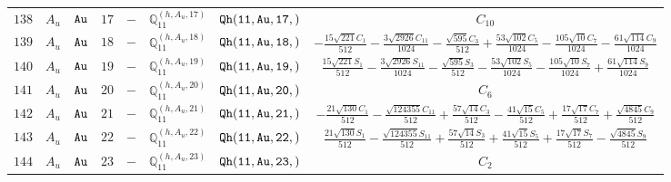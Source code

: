 \documentclass[fleqn,8pt]{jsarticle}
\begin{document}
\begin{table}[ht!]
\begin{center}
\begin{tabular}{cccccccc}
$ 138 $ & $ A_{u} $ & $ {\tt Au} $ & $ 17 $ & $ - $ & $ \mathbb{Q}_{11}^{(h,A_{u},17)} $ & $ {\tt Qh(11,Au,17,)} $ & $ C_{10} $ \\
$ 139 $ & $ A_{u} $ & $ {\tt Au} $ & $ 18 $ & $ - $ & $ \mathbb{Q}_{11}^{(h,A_{u},18)} $ & $ {\tt Qh(11,Au,18,)} $ & $ - \frac{15 \sqrt{221} C_{1}}{512} - \frac{3 \sqrt{2926} C_{11}}{1024} - \frac{\sqrt{595} C_{3}}{512} + \frac{53 \sqrt{102} C_{5}}{1024} - \frac{105 \sqrt{10} C_{7}}{1024} - \frac{61 \sqrt{114} C_{9}}{1024} $ \\
$ 140 $ & $ A_{u} $ & $ {\tt Au} $ & $ 19 $ & $ - $ & $ \mathbb{Q}_{11}^{(h,A_{u},19)} $ & $ {\tt Qh(11,Au,19,)} $ & $ \frac{15 \sqrt{221} S_{1}}{512} - \frac{3 \sqrt{2926} S_{11}}{1024} - \frac{\sqrt{595} S_{3}}{512} - \frac{53 \sqrt{102} S_{5}}{1024} - \frac{105 \sqrt{10} S_{7}}{1024} + \frac{61 \sqrt{114} S_{9}}{1024} $ \\
$ 141 $ & $ A_{u} $ & $ {\tt Au} $ & $ 20 $ & $ - $ & $ \mathbb{Q}_{11}^{(h,A_{u},20)} $ & $ {\tt Qh(11,Au,20,)} $ & $ C_{6} $ \\
$ 142 $ & $ A_{u} $ & $ {\tt Au} $ & $ 21 $ & $ - $ & $ \mathbb{Q}_{11}^{(h,A_{u},21)} $ & $ {\tt Qh(11,Au,21,)} $ & $ - \frac{21 \sqrt{130} C_{1}}{512} - \frac{\sqrt{124355} C_{11}}{512} + \frac{57 \sqrt{14} C_{3}}{512} - \frac{41 \sqrt{15} C_{5}}{512} + \frac{17 \sqrt{17} C_{7}}{512} + \frac{\sqrt{4845} C_{9}}{512} $ \\
$ 143 $ & $ A_{u} $ & $ {\tt Au} $ & $ 22 $ & $ - $ & $ \mathbb{Q}_{11}^{(h,A_{u},22)} $ & $ {\tt Qh(11,Au,22,)} $ & $ \frac{21 \sqrt{130} S_{1}}{512} - \frac{\sqrt{124355} S_{11}}{512} + \frac{57 \sqrt{14} S_{3}}{512} + \frac{41 \sqrt{15} S_{5}}{512} + \frac{17 \sqrt{17} S_{7}}{512} - \frac{\sqrt{4845} S_{9}}{512} $ \\
$ 144 $ & $ A_{u} $ & $ {\tt Au} $ & $ 23 $ & $ - $ & $ \mathbb{Q}_{11}^{(h,A_{u},23)} $ & $ {\tt Qh(11,Au,23,)} $ & $ C_{2} $ \\
 \hline \hline
\end{tabular}
\end{center}
\end{table}
\end{document}
